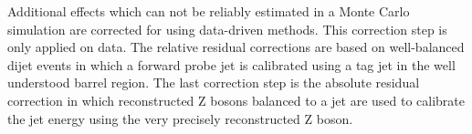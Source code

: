 Additional effects which can not be reliably estimated in a Monte Carlo
simulation are corrected for using data-driven methods. This correction step is
only applied on data. The relative residual corrections are based on
well-balanced dijet events in which a forward probe jet is calibrated using a
tag jet in the well understood barrel region. The last correction step is the
absolute residual correction in which reconstructed Z bosons balanced to a jet
are used to calibrate the jet energy using the very precisely reconstructed Z
boson.

